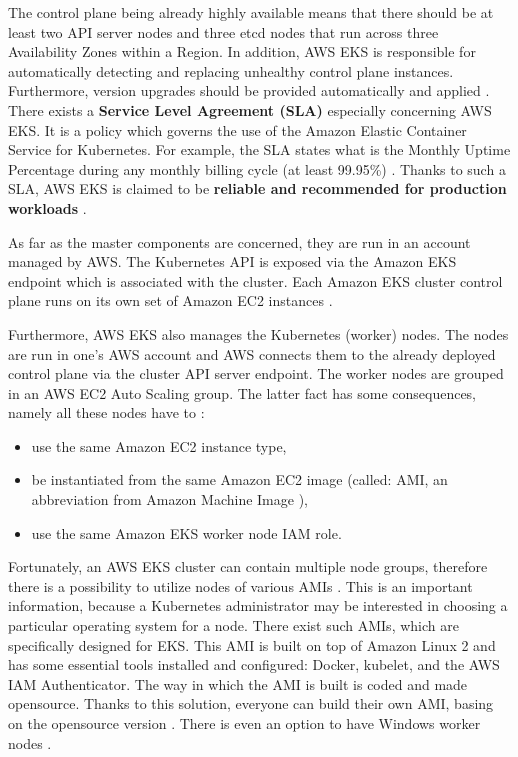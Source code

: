 The control plane being already highly available means that there should be at least two API server nodes and three etcd nodes that run across three Availability Zones within a Region. In addition, AWS EKS is responsible for automatically detecting and replacing unhealthy control plane instances. Furthermore, version upgrades should be provided automatically and applied \cite{what-is-eks}. There exists a \textbf{Service Level Agreement (SLA)} especially concerning AWS EKS. It is a policy which governs the use of the Amazon Elastic Container Service for Kubernetes. For example, the SLA states what is the Monthly Uptime Percentage during any monthly billing cycle (at least 99.95\%) \cite{eks-sla}. Thanks to such a SLA, AWS EKS is claimed to be \textbf{reliable and recommended for production workloads} \cite{what-is-eks}.

As far as the master components are concerned, they are run in an account managed by AWS. The Kubernetes API is exposed via the Amazon EKS endpoint which is associated with the cluster. Each Amazon EKS cluster control plane runs on its own set of Amazon EC2 instances \cite{eks-clusters}.

Furthermore, AWS EKS also manages the Kubernetes (worker) nodes. The nodes are run in one's AWS account and AWS connects them to the already deployed control plane via the cluster API server endpoint. The worker nodes are grouped in an AWS EC2 Auto Scaling group. The latter fact has some consequences, namely all these nodes have to \cite{eks-worker}:
\begin{itemize}
\item use the same Amazon EC2 instance type,
\item be instantiated from the same Amazon EC2 image (called: AMI, an abbreviation from Amazon Machine Image \cite{aws-ami}),
\item use the same Amazon EKS worker node IAM role.
\end{itemize}

Fortunately, an AWS EKS cluster can contain multiple node groups, therefore there is a possibility to utilize nodes of various AMIs \cite{eks-worker}. This is an important information, because a Kubernetes administrator may be interested in choosing a particular operating system for a node. There exist such AMIs, which are specifically designed for EKS. This AMI is built on top of Amazon Linux 2 and has some essential tools installed and configured: Docker, kubelet, and the AWS IAM Authenticator. The way in which the AMI is built is coded and made opensource. Thanks to this solution, everyone can build their own AMI, basing on the opensource version \cite{eks-optimized-ami}. There is even an option to have Windows worker nodes \cite{eks-worker-win}.

